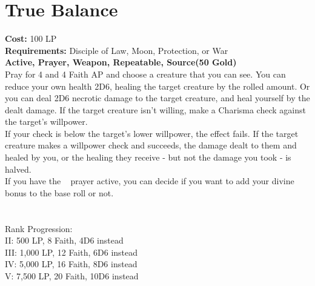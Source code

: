 \section{True Balance}\label{prayer:trueBalance}
\textbf{Cost:} 100 LP\\
\textbf{Requirements:} Disciple of Law, Moon, Protection, or War \\
\textbf{Active, Prayer, Weapon, Repeatable, Source(50 Gold)}\\
Pray for 4 and 4 Faith AP and choose a creature that you can see.
You can reduce your own health 2D6, healing the target creature by the rolled amount.
Or you can deal 2D6 necrotic damage to the target creature, and heal yourself by the dealt damage.
If the target creature isn't willing, make a Charisma check against the target's willpower.\\
If your check is below the target's lower willpower, the effect fails.
If the target creature makes a willpower check and succeeds, the damage dealt to them and healed by you, or the healing they receive - but not the damage you took - is halved.\\
If you have the ~ prayer active, you can decide if you want to add your divine bonus to the base roll or not.\\
\\
\\
Rank Progression:\\
II: 500 LP, 8 Faith, 4D6 instead\\
III: 1,000 LP, 12 Faith, 6D6 instead\\
IV: 5,000 LP, 16 Faith, 8D6 instead\\
V: 7,500 LP, 20 Faith, 10D6 instead\\